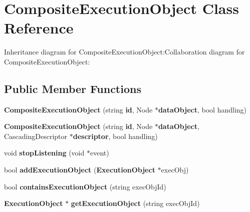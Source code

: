 \section{CompositeExecutionObject Class Reference}
\label{classbr_1_1pucrio_1_1telemidia_1_1ginga_1_1ncl_1_1model_1_1components_1_1CompositeExecutionObject}
Inheritance diagram for CompositeExecutionObject:Collaboration diagram for CompositeExecutionObject:\subsection*{Public Member Functions}
\begin{CompactItemize}
\item 
\textbf{CompositeExecutionObject} (string {\bf id}, Node $\ast${\bf dataObject}, bool handling)\label{classbr_1_1pucrio_1_1telemidia_1_1ginga_1_1ncl_1_1model_1_1components_1_1CompositeExecutionObject_4632003b2c6494502ce23c8e901ae641}

\item 
\textbf{CompositeExecutionObject} (string {\bf id}, Node $\ast${\bf dataObject}, CascadingDescriptor $\ast${\bf descriptor}, bool handling)\label{classbr_1_1pucrio_1_1telemidia_1_1ginga_1_1ncl_1_1model_1_1components_1_1CompositeExecutionObject_ad709f378861cd088d8a5b28f15515d4}

\item 
void \textbf{stopListening} (void $\ast$event)\label{classbr_1_1pucrio_1_1telemidia_1_1ginga_1_1ncl_1_1model_1_1components_1_1CompositeExecutionObject_30fe02416806f60f10cfcc8e42cbefb3}

\item 
bool \textbf{addExecutionObject} ({\bf ExecutionObject} $\ast$execObj)\label{classbr_1_1pucrio_1_1telemidia_1_1ginga_1_1ncl_1_1model_1_1components_1_1CompositeExecutionObject_ebb3c8b8bea80863211d28899f38e3c7}

\item 
bool \textbf{containsExecutionObject} (string execObjId)\label{classbr_1_1pucrio_1_1telemidia_1_1ginga_1_1ncl_1_1model_1_1components_1_1CompositeExecutionObject_bed578d3972bad0f1be9bc19c2085e75}

\item 
{\bf ExecutionObject} $\ast$ \textbf{getExecutionObject} (string execObjId)\label{classbr_1_1pucrio_1_1telemidia_1_1ginga_1_1ncl_1_1model_1_1components_1_1CompositeExecutionObject_cbe6647c9b5b8dca26405df562c44670}


\end{CompactItemize}
